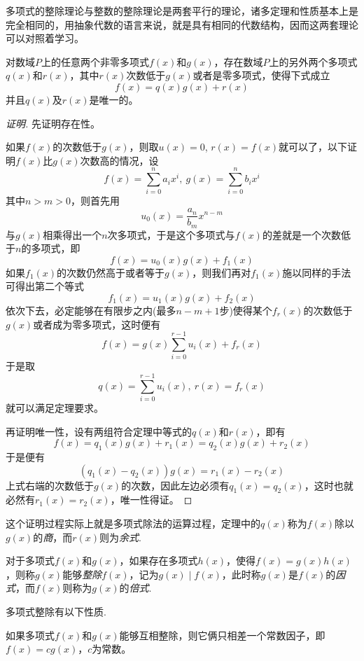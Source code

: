多项式的整除理论与整数的整除理论是两套平行的理论，诸多定理和性质基本上是完全相同的，用抽象代数的语言来说，就是具有相同的代数结构，因而这两套理论可以对照着学习。

\begin{theorem}[带余除法]
  对数域$P$上的任意两个非零多项式$f(x)$和$g(x)$，存在数域$P$上的另外两个多项式$q(x)$和$r(x)$，其中$r(x)$次数低于$g(x)$或者是零多项式，使得下式成立
  \[ f(x) = q(x) g(x) + r(x) \]
  并且$q(x)$及$r(x)$是唯一的。
\end{theorem}

\begin{proof}[证明]
  先证明存在性。
  
  如果$f(x)$的次数低于$g(x)$，则取$u(x)=0$, $r(x)=f(x)$就可以了，以下证明$f(x)$比$g(x)$次数高的情况，设
  \[ f(x)=\sum_{i=0}^na_ix^i, \   g(x)=\sum_{i=0}^nb_ix^i \]
  其中$n>m>0$，则首先用
  \[ u_0(x)=\frac{a_n}{b_m}x^{n-m} \]
  与$g(x)$相乘得出一个$n$次多项式，于是这个多项式与$f(x)$的差就是一个次数低于$n$的多项式，即
  \[ f(x) = u_0(x) g(x) + f_1(x) \]
  如果$f_1(x)$的次数仍然高于或者等于$g(x)$，则我们再对$f_1(x)$施以同样的手法可得出第二个等式
  \[ f_1(x) = u_1(x)g(x) + f_2(x) \]
  依次下去，必定能够在有限步之内(最多$n-m+1$步)使得某个$f_r(x)$的次数低于$g(x)$或者成为零多项式，这时便有
  \[ f(x) = g(x) \sum_{i=0}^{r-1}u_i(x) + f_r(x) \]
  于是取
  \[ q(x)=\sum_{i=0}^{r-1}u_i(x), \  r(x)=f_r(x) \]
  就可以满足定理要求。

  再证明唯一性，设有两组符合定理中等式的$q(x)$和$r(x)$，即有
  \[ f(x) = q_1(x)g(x)+r_1(x) = q_2(x)g(x)+r_2(x) \]
  于是便有
  \[ (q_1(x)-q_2(x)) g(x) = r_1(x)-r_2(x) \]
  上式右端的次数低于$g(x)$的次数，因此左边必须有$q_1(x)=q_2(x)$，这时也就必然有$r_1(x)=r_2(x)$，唯一性得证。
\end{proof}

这个证明过程实际上就是多项式除法的运算过程，定理中的$q(x)$称为$f(x)$除以$g(x)$的\emph{商}，而$r(x)$则为\emph{余式}.

\begin{definition}
  对于多项式$f(x)$和$g(x)$，如果存在多项式$h(x)$，使得$f(x)=g(x)h(x)$，则称$g(x)$能够\emph{整除}$f(x)$，记为$g(x) \mid f(x)$，此时称$g(x)$是$f(x)$的\emph{因式}，而$f(x)$则称为$g(x)$的\emph{倍式}.
\end{definition}

多项式整除有以下性质.
\begin{property}
  如果多项式$f(x)$和$g(x)$能够互相整除，则它俩只相差一个常数因子，即$f(x)=cg(x)$，$c$为常数。
\end{property}

